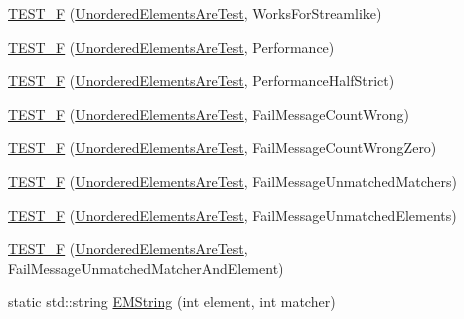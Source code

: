 \begin{DoxyCompactItemize}
\item 
\mbox{\hyperlink{namespacetesting_1_1gmock__matchers__test_a2affca2a152e4537c2f06518eaa2eac5}{T\+E\+S\+T\+\_\+F}} (\mbox{\hyperlink{classtesting_1_1gmock__matchers__test_1_1UnorderedElementsAreTest}{Unordered\+Elements\+Are\+Test}}, Works\+For\+Streamlike)
\item 
\mbox{\hyperlink{namespacetesting_1_1gmock__matchers__test_a074ca2babea203d1a54d69ff1fde5c59}{T\+E\+S\+T\+\_\+F}} (\mbox{\hyperlink{classtesting_1_1gmock__matchers__test_1_1UnorderedElementsAreTest}{Unordered\+Elements\+Are\+Test}}, Performance)
\item 
\mbox{\hyperlink{namespacetesting_1_1gmock__matchers__test_a4437de9d40efd87f73b738ef38c2d70f}{T\+E\+S\+T\+\_\+F}} (\mbox{\hyperlink{classtesting_1_1gmock__matchers__test_1_1UnorderedElementsAreTest}{Unordered\+Elements\+Are\+Test}}, Performance\+Half\+Strict)
\item 
\mbox{\hyperlink{namespacetesting_1_1gmock__matchers__test_a5dd3b28b540c1ef01e623f840c48e7b4}{T\+E\+S\+T\+\_\+F}} (\mbox{\hyperlink{classtesting_1_1gmock__matchers__test_1_1UnorderedElementsAreTest}{Unordered\+Elements\+Are\+Test}}, Fail\+Message\+Count\+Wrong)
\item 
\mbox{\hyperlink{namespacetesting_1_1gmock__matchers__test_a7dc8c467fe0d6f26c0ee643be56eb590}{T\+E\+S\+T\+\_\+F}} (\mbox{\hyperlink{classtesting_1_1gmock__matchers__test_1_1UnorderedElementsAreTest}{Unordered\+Elements\+Are\+Test}}, Fail\+Message\+Count\+Wrong\+Zero)
\item 
\mbox{\hyperlink{namespacetesting_1_1gmock__matchers__test_a11b785087491ae58b074fa8dbbc88cd4}{T\+E\+S\+T\+\_\+F}} (\mbox{\hyperlink{classtesting_1_1gmock__matchers__test_1_1UnorderedElementsAreTest}{Unordered\+Elements\+Are\+Test}}, Fail\+Message\+Unmatched\+Matchers)
\item 
\mbox{\hyperlink{namespacetesting_1_1gmock__matchers__test_a6dfb50dcbb543de71fcc4d09844d36b3}{T\+E\+S\+T\+\_\+F}} (\mbox{\hyperlink{classtesting_1_1gmock__matchers__test_1_1UnorderedElementsAreTest}{Unordered\+Elements\+Are\+Test}}, Fail\+Message\+Unmatched\+Elements)
\item 
\mbox{\hyperlink{namespacetesting_1_1gmock__matchers__test_a2395b7e71b7ad50af72caa61c10e6898}{T\+E\+S\+T\+\_\+F}} (\mbox{\hyperlink{classtesting_1_1gmock__matchers__test_1_1UnorderedElementsAreTest}{Unordered\+Elements\+Are\+Test}}, Fail\+Message\+Unmatched\+Matcher\+And\+Element)
\item 
static std\+::string \mbox{\hyperlink{namespacetesting_1_1gmock__matchers__test_a9e6816bb66047e834f73ce571f2598d1}{E\+M\+String}} (int element, int matcher)

\end{DoxyCompactItemize}
